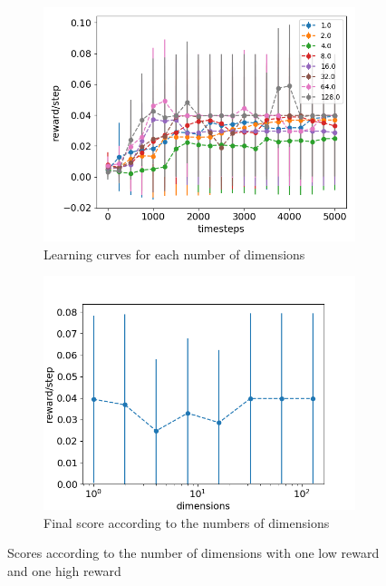 \documentclass{article}
\begin{document}
\begin{figure}[H]
  \centering
  \begin{subfigure}[b]{0.45\linewidth}
    \includegraphics[width=\linewidth]{Study_3/one_reset_indept/scores_dimensions.png}
      \caption{Learning curves for each number of dimensions}
  \end{subfigure}
  \begin{subfigure}[b]{0.47\linewidth}
    \includegraphics[width=\linewidth]{Study_3/one_reset_indept/total_scores.png}
    \caption{Final score according to the numbers of dimensions}
  \end{subfigure}
  \caption{Scores according to the number of dimensions with one low reward and one high reward}
  \label{fig:curves_dimensions_one}
\end{figure}
\end{document}
